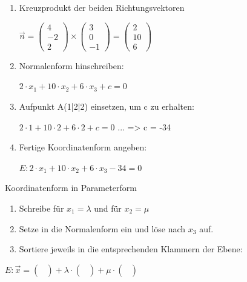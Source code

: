 \documentclass[paper=a6,landscape,ngerman,twoside=true,fontsize=12pt]{scrartcl}
\begin{document}
\begin{antwort}
	\normalsize
	\begin{enumerate} 
		\item Kreuzprodukt der beiden Richtungsvektoren
		
		$\vec{n}=\left(\begin{array}{c} 4 \\ -2 \\ 2\end{array} \right) \times \left(\begin{array}{c} 3 \\0 \\ -1\end{array} \right)=\left(\begin{array}{c} 2 \\10 \\ 6\end{array} \right)$
		
		\item Normalenform hinschreiben: 
		
		$2 \cdot x_1 + 10 \cdot x_2+6 \cdot x_3 + c = 0$
		
		\item Aufpunkt A(1|2|2) einsetzen, um c zu erhalten: 
		
		$2 \cdot 1 + 10 \cdot 2+6 \cdot 2 + c = 0$
		... => c = -34
		
		\item Fertige Koordinatenform angeben: 
		
		$E: 2 \cdot x_1 + 10 \cdot x_2+6 \cdot x_3  -34 = 0$
			
	\end{enumerate} 
	
\end{antwort}
\begin{frage}
	\LARGE
	Koordinatenform in Parameterform
	
\end{frage}
\begin{antwort}
	\normalsize
	\begin{enumerate} 
		\item Schreibe für $x_1 = \lambda$ und für $x_2=\mu$	
		\item Setze in die Normalenform ein und löse nach $x_3$ auf.
		\item Sortiere jeweils in die entsprechenden Klammern der Ebene:			
	\end{enumerate} 
	$E:\vec{x}=\left(\begin{array}{c}  \\  \\ \end{array} \right)+\lambda \cdot \left(\begin{array}{c}  \\  \\ \end{array} \right)+\mu \cdot \left(\begin{array}{c}  \\ \\ \end{array} \right)$
	
\end{antwort}
\end{document}
